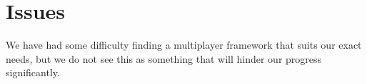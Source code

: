 \section{Issues}

We have had some difficulty finding a multiplayer framework that suits our exact needs, but we do not see this as something that will hinder our progress significantly.




